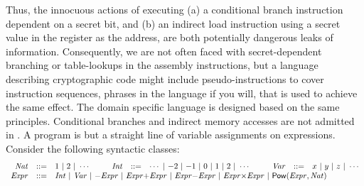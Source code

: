 Thus, the innocuous actions of executing (a) a conditional
branch instruction dependent on a secret bit, and (b) an
indirect load instruction using a secret value in the register as the
address, are both potentially dangerous leaks of information.
Consequently, we are not often
faced with secret-dependent branching or table-lookups in the assembly
instructions, but a language describing cryptographic code might
include pseudo-instructions to cover instruction sequences, phrases in
the language if you will, that is used to achieve the same effect.
The domain specific language \mydsl is designed based on the same
principles. Conditional branches and indirect memory accesses are not
admitted in \mydsl. A program is but a straight line of variable
assignments on expressions. 
Consider the following syntactic classes:
\[
\begin{array}{rclcrclcrcl}
  \Nat & ::= & {1}\ |\ {2}\ |\ \cdots
  & \hspace{.02\columnwidth} &
  \Int & ::= & \cdots \ |\ {-2}\ |\ {-1} \ |\ 0\ |\ 
             {1}\ |\ {2}\ |\ \cdots
  & \hspace{.02\columnwidth} &
  \Var & ::= & {x} \ |\ {y} \ |\ {z} \ |\ \cdots\\
  \Expr & ::= &  \multicolumn{9}{l}
               { \Int \ |\ \Var \ |\  {-}\Expr \ |\ 
                 \Expr {+} \Expr \ |\ \Expr {-} \Expr \ |\ 
                 \Expr {\times} \Expr \ |\ \dslcode{Pow} (\Expr, \Nat) }
\end{array}
\]

